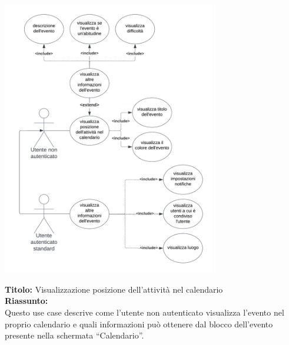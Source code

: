 \begin{listaPersonale}[UC]{}
    \newpage


    \begin{center}
        \includegraphics[width=0.7\textwidth]{img/Diagrammi/UseCases/InserimentoAutomaticoCalendario.png}
    \end{center}

    \begin{listaPersonale2} [UC] {}
    \textbf{Titolo:} Visualizzazione posizione dell'attività nel calendario \\
    \textbf{Riassunto: } \\
    Questo use case descrive come l'utente non autenticato visualizza l'evento nel proprio calendario e quali informazioni può ottenere dal blocco dell'evento presente nella schermata “Calendario”.


\end{listaPersonale2}
\end{listaPersonale}
